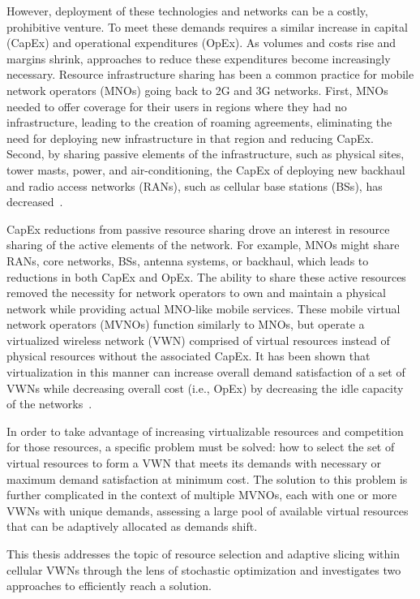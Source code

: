 \documentclass[12pt,dvipsnames]{report}
\begin{document}
However, deployment of these technologies and networks can be a costly, prohibitive venture.  To meet these demands requires a similar increase in capital (CapEx) and operational expenditures (OpEx).  As volumes and costs rise and margins shrink, approaches to reduce these expenditures become increasingly necessary.  Resource infrastructure sharing has been a common practice for mobile network operators (MNOs) going back to 2G and 3G networks.  First, MNOs needed to offer coverage for their users in regions where they had no infrastructure, leading to the creation of roaming agreements, eliminating the need for deploying new infrastructure in that region and reducing CapEx.  Second, by sharing passive elements of the infrastructure, such as physical sites, tower masts, power, and air-conditioning, the CapEx of deploying new backhaul and radio access networks (RANs), such as cellular base stations (BSs), has decreased~\cite{1421931}.

CapEx reductions from passive resource sharing drove an interest in resource sharing of the active elements of the network.  For example, MNOs might share RANs, core networks, BSs, antenna systems, or backhaul, which leads to reductions in both CapEx and OpEx.  The ability to share these active resources removed the necessity for network operators to own and maintain a physical network while providing actual MNO-like mobile services.  These mobile virtual network operators (MVNOs) function similarly to MNOs, but operate a virtualized wireless network (VWN) comprised of virtual resources instead of physical resources without the associated CapEx.  It has been shown that virtualization in this manner can increase overall demand satisfaction of a set of VWNs while decreasing overall cost (i.e., OpEx) by decreasing the idle capacity of the networks~\cite{MJ_CCNC_16}.

In order to take advantage of increasing virtualizable resources and competition for those resources, a specific problem must be solved: how to select the set of virtual resources to form a VWN that meets its demands with necessary or maximum demand satisfaction at minimum cost.  The solution to this problem is further complicated in the context of multiple MVNOs, each with one or more VWNs with unique demands, assessing a large pool of available virtual resources that can be adaptively allocated as demands shift.

This thesis addresses the topic of resource selection and adaptive slicing within cellular VWNs through the lens of stochastic optimization and investigates two approaches to efficiently reach a solution.
\end{document}
